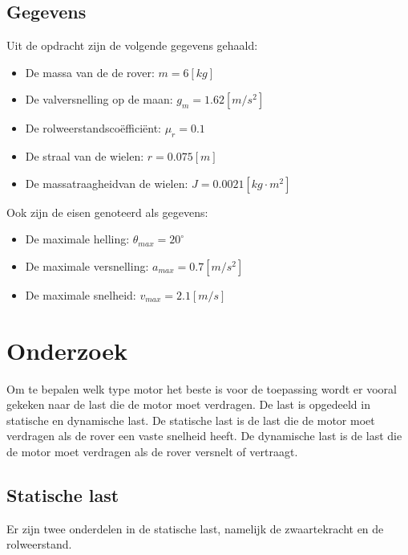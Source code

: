 \documentclass{article}
\begin{document}
    \subsection{Gegevens}
        Uit de opdracht zijn de volgende gegevens gehaald:
        \begin{itemize}
            \item De massa van de de rover: $m = 6[kg]$
            \item De valversnelling op de maan: $g_m = 1.62[m/s^2]$
            \item De rolweerstandscoëfficiënt: $\mu_r = 0.1$
            \item De straal van de wielen: $r = 0.075[m]$
            \item De massatraagheidvan de wielen: $J = 0.0021[kg \cdot m^2]$
        \end{itemize}
        Ook zijn de eisen genoteerd als gegevens:
        \begin{itemize}
            \item De maximale helling: $\theta_{max} = 20^\circ$
            \item De maximale versnelling: $a_{max} = 0.7[m/s^2]$
            \item De maximale snelheid: $v_{max} = 2.1[m/s]$
        \end{itemize}

\section{Onderzoek}
    Om te bepalen welk type motor het beste is voor de toepassing wordt er vooral gekeken naar de last die de motor moet verdragen.
    De last is opgedeeld in statische en dynamische last. 
    De statische last is de last die de motor moet verdragen als de rover een vaste snelheid heeft.
    De dynamische last is de last die de motor moet verdragen als de rover versnelt of vertraagt.
    \newline
    





    \subsection{Statische last}
        Er zijn twee onderdelen in de statische last, namelijk de zwaartekracht en de rolweerstand. 
\end{document}
